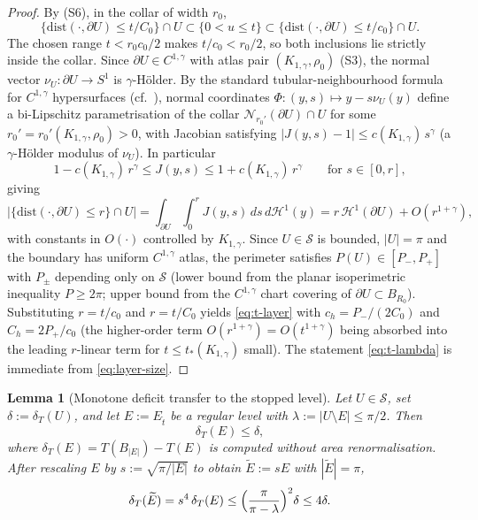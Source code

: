 \documentclass[11pt]{amsart}
\newtheorem{lemma}[theorem]{Lemma}
\newcommand{\Et}{E_{\hat t}}
\newcommand{\dT}{\delta_T}
\newcommand{\HH}{\mathcal H}
\newcommand{\Etil}{\widetilde E}
\newcommand{\Sclass}{\mathcal S}
\begin{document}
\begin{proof}
By (S6), in the collar of width $r_0$,
\[
   \{\mathrm{dist}(\cdot,\partial U)\le t/C_0\}\cap U
      \subset
   \{0<u\le t\}
      \subset
   \{\mathrm{dist}(\cdot,\partial U)\le t/c_0\}\cap U.
\]
The chosen range $t<r_0c_0/2$ makes $t/c_0<r_0/2$, so both
inclusions lie strictly inside the collar.  Since $\partial U\in
C^{1,\gamma}$ with atlas pair $(K_{1,\gamma},\rho_0)$ (S3), the
normal vector $\nu_U:\partial U\to S^1$ is $\gamma$-Hölder.  By the
standard tubular-neighbourhood formula for $C^{1,\gamma}$
hypersurfaces \textup{(}cf.\ \cite[Theorem~3.1]{HP}\textup{)}, normal
coordinates $\Phi:(y,s)\mapsto y-s\nu_U(y)$ define a bi-Lipschitz
parametrisation of the collar
$\mathcal N_{r_0'}(\partial U)\cap U$ for some
$r_0'=r_0'(K_{1,\gamma},\rho_0)>0$, with Jacobian satisfying
$|J(y,s)-1|\le c(K_{1,\gamma})\,s^\gamma$ (a $\gamma$-Hölder
modulus of $\nu_U$).  In particular
\[
   1-c(K_{1,\gamma})\,r^\gamma\le J(y,s)\le 1+c(K_{1,\gamma})\,r^\gamma
   \qquad\text{for }s\in[0,r],
\]
giving
\[
   |\{\mathrm{dist}(\cdot,\partial U)\le r\}\cap U|
      =\int_{\partial U}\int_0^r J(y,s)\,ds\,d\HH^1(y)
      =r\,\HH^1(\partial U)+O(r^{1+\gamma}),
\]
with constants in $O(\cdot)$ controlled by $K_{1,\gamma}$.  Since
$U\in\Sclass$ is bounded, $|U|=\pi$ and the boundary has uniform
$C^{1,\gamma}$ atlas, the perimeter satisfies $P(U)\in[P_-,P_+]$ with
$P_\pm$ depending only on $\Sclass$ (lower bound from the planar
isoperimetric inequality $P\ge 2\pi$; upper bound from the
$C^{1,\gamma}$ chart covering of $\partial U\subset B_{R_0}$).
Substituting $r=t/c_0$ and $r=t/C_0$ yields \eqref{eq:t-layer} with
$c_h=P_-/(2C_0)$ and $C_h=2P_+/c_0$ (the higher-order term
$O(r^{1+\gamma})=O(t^{1+\gamma})$ being absorbed into the leading
$r$-linear term for $t\le t_*(K_{1,\gamma})$ small).  The statement
\eqref{eq:t-lambda} is immediate from \eqref{eq:layer-size}.
\end{proof}

\begin{lemma}[Monotone deficit transfer to the stopped level]
\label{lem:def-transfer}
Let \(U\in\Sclass\), set \(\delta:=\dT(U)\), and let \(E:=\Et\) be a
regular level with \(\lambda:=|U\setminus E|\le\pi/2\).  Then
\begin{equation}\label{eq:def-transfer}
   \dT(E)\le\delta,
\end{equation}
where \(\dT(E)=T(B_{|E|})-T(E)\) is computed without area
renormalisation.  After rescaling \(E\) by
\(s:=\sqrt{\pi/|E|}\) to obtain \(\Etil:=sE\) with \(|\Etil|=\pi\),
\begin{equation}\label{eq:def-transfer-norm}
   \dT(\Etil)=s^4\,\dT(E)
      \le\Bigl(\frac{\pi}{\pi-\lambda}\Bigr)^{2}\delta
      \le 4\delta.
\end{equation}
\end{lemma}
\end{document}
